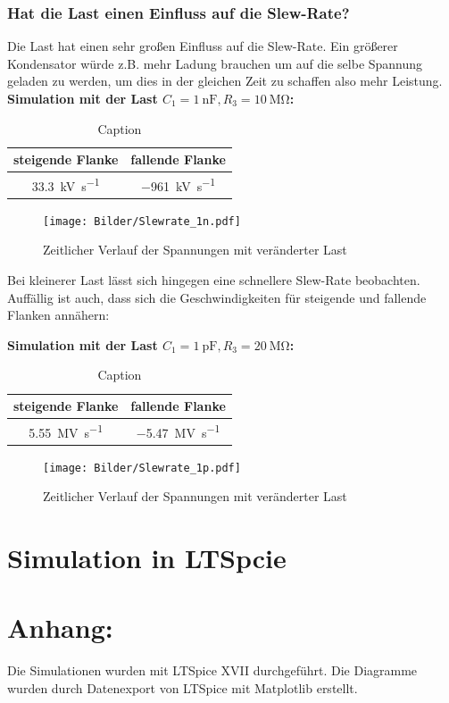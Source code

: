 \subsubsection{Hat die Last einen Einfluss auf die Slew-Rate?}

Die Last hat einen sehr großen Einfluss auf die Slew-Rate. Ein größerer Kondensator würde z.B. mehr Ladung brauchen um auf die selbe Spannung geladen zu werden, um dies in der gleichen Zeit zu schaffen also mehr Leistung.\\

\textbf{Simulation mit der Last $C_1 = \SI{1}{\nano \farad}, R_3 = \SI{10}{\mega \ohm}$:}

\begin{table}[H]
    \centering
    \begin{tabular}{|c|c|}
    \hline
         steigende Flanke & fallende Flanke  \\ \hline
         \SI{33.3}{\kilo \volt \per \second} & \SI{-961}{\kilo \volt \per \second} \\ \hline
    \end{tabular}
    \caption{Caption}
    \label{tab:my_label}
\end{table}

\begin{figure}[H]
    \centering
    \texttt{[image: Bilder/Slewrate\_1n.pdf]}
    \caption{Zeitlicher Verlauf der Spannungen mit veränderter Last}
\end{figure}

Bei kleinerer Last lässt sich hingegen eine schnellere Slew-Rate beobachten. Auffällig ist auch, dass sich die Geschwindigkeiten für steigende und fallende Flanken annähern:

\textbf{Simulation mit der Last $C_1 = \SI{1}{\pico \farad}, R_3 = \SI{20}{\mega \ohm}$:}

\begin{table}[H]
    \centering
    \begin{tabular}{|c|c|}
    \hline
         steigende Flanke & fallende Flanke  \\ \hline
         \SI{5.55}{\mega \volt \per \second} & \SI{-5.47}{\mega \volt \per \second} \\ \hline
    \end{tabular}
    \caption{Caption}
    \label{tab:my_label}
\end{table}

\begin{figure}[H]
    \centering
    \texttt{[image: Bilder/Slewrate\_1p.pdf]}
    \caption{Zeitlicher Verlauf der Spannungen mit veränderter Last}
\end{figure}

\section{Simulation in LTSpcie}

\section{Anhang:}

Die Simulationen wurden mit LTSpice XVII durchgeführt. Die Diagramme wurden durch Datenexport von LTSpice mit Matplotlib erstellt.